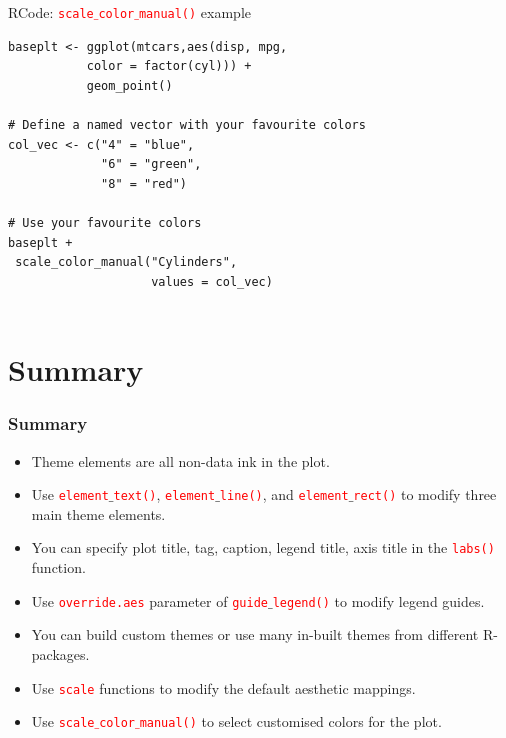 \documentclass{beamer}
\begin{document}
\begin{frame}[fragile]{RCode: \texttt{\textcolor{red}{scale$\_$color$\_$manual()}} example}
\begin{lstlisting}
baseplt <- ggplot(mtcars,aes(disp, mpg, 
           color = factor(cyl))) +
           geom_point()

# Define a named vector with your favourite colors
col_vec <- c("4" = "blue",
             "6" = "green", 
             "8" = "red")

# Use your favourite colors
baseplt +
 scale_color_manual("Cylinders",
                    values = col_vec)
                    
\end{lstlisting}
\end{frame}

\section{Summary}
\begin{frame}\frametitle{Summary}
\begin{itemize}
\item Theme elements are all non-data ink in the plot.
\item Use \texttt{\textcolor{red}{element}$\_$\textcolor{red}{text()}}, \texttt{\textcolor{red}{element}$\_$\textcolor{red}{line()}}, and \texttt{\textcolor{red}{element}$\_$\textcolor{red}{rect()}} to modify three main theme elements.

\item You can specify plot title, tag, caption, legend title, axis title in the \textcolor{red}{\texttt{labs()}} function.

\item Use \texttt{\textcolor{red}{override.aes}} parameter of \texttt{\textcolor{red}{guide}$\_$\textcolor{red}{legend()}} to modify legend guides.

\item You can build custom themes or use many in-built themes from different R-packages. 

\item Use \textcolor{red}{\texttt{scale}} functions to modify the default aesthetic mappings.

\item Use \texttt{\textcolor{red}{scale$\_$color$\_$manual()}} to select customised colors for the plot.
\end{itemize}
\end{frame}
\end{document}
